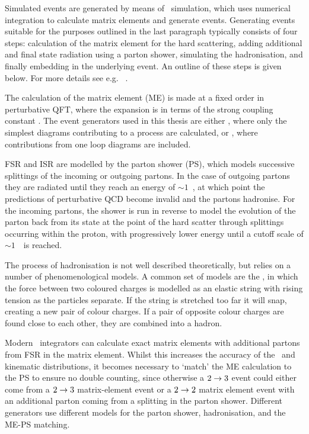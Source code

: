 Simulated events are generated by
means of \mc\ simulation, which uses numerical integration to calculate matrix
elements and generate events. Generating events suitable for the purposes
outlined in the last paragraph typically consists of four steps:
calculation of the matrix element for the hard scattering, adding additional and
final state radiation using a parton shower,
simulating the hadronisation, and finally embedding in the underlying event. An
outline of these steps is given below. For more details see e.g.
~\cite{Sjostrand:2006su,Campbell:2006wx}.

The calculation of the matrix element (ME) is
made at a fixed order in perturbative QFT, where the expansion is in terms of
the strong coupling constant \alphaS. The event generators used in this thesis
are either , where only the simplest diagrams
contributing to a process are calculated, or ,
where contributions from one loop diagrams are included. 

FSR and ISR are
modelled by the parton shower (PS), which models successive splittings of the
incoming or outgoing partons. In the case of outgoing partons they are radiated
until they reach an energy of $\sim1$~\gev, at
which point the predictions of perturbative QCD become invalid and the partons
hadronise. For the incoming partons, the
shower is run in reverse to model the evolution of the parton back from its state
at the point of the hard scatter through splittings occurring within the proton,
with progressively lower energy until a cutoff scale of $\sim1$~\gev\ is reached.

The process of hadronisation is not well described theoretically,
but relies on a number of phenomenological models. A common set of models are
the , in which the
force between two coloured charges is modelled as an elastic string with
rising tension as the particles separate. If the string is stretched too far
it will snap, creating a new pair of colour charges. If a pair of opposite
colour charges are found close to each other, they are combined into a hadron.

Modern \mc\ integrators can calculate exact matrix elements with additional
partons from FSR in the matrix element. Whilst this increases the accuracy of
the \cx\ and kinematic distributions, it becomes necessary to `match' the
ME calculation to the PS to ensure no double counting, since otherwise a
$2\rightarrow3$ event could either come from a $2\rightarrow3$ matrix-element event or a $2\rightarrow2$
matrix element event with an additional parton coming from a splitting in the
parton shower. Different generators use different models for the parton
shower, hadronisation, and the ME-PS matching.

